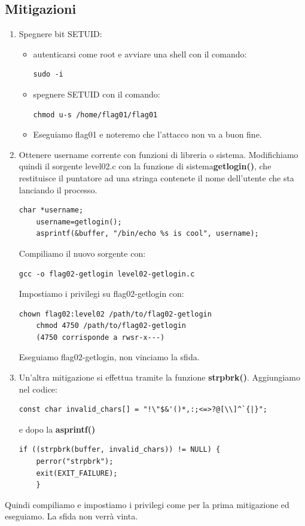 \subsection{Mitigazioni}
\begin{enumerate}
    \item Spegnere bit SETUID:
    \begin{itemize}
        \item autenticarsi come root e avviare una shell con il comando: \begin{lstlisting}[style=bashstyle] 
        sudo -i
        \end{lstlisting}
        \item spegnere SETUID con il comando: \begin{lstlisting}[style=bashstyle] 
        chmod u-s /home/flag01/flag01
        \end{lstlisting}   
        \item Eseguiamo flag01 e noteremo che l’attacco non va a buon fine. 
    \end{itemize}
    \item Ottenere username corrente con funzioni di libreria o sistema. Modifichiamo quindi il sorgente level02.c con la funzione di sistema\textbf{getlogin()}, che restituisce il puntatore ad una stringa contenete il nome dell’utente che sta lanciando il processo.
    \begin{lstlisting}[style=cstyle]
    char *username; 
    username=getlogin(); 
    asprintf(&buffer, "/bin/echo %s is cool", username);
    \end{lstlisting}
    Compiliamo il nuovo sorgente con:
    \begin{lstlisting}[style=bashstyle]
    gcc -o flag02-getlogin level02-getlogin.c
    \end{lstlisting}
    Impostiamo i privilegi su flag02-getlogin con:
    \begin{lstlisting}[style=bashstyle]
    chown flag02:level02 /path/to/flag02-getlogin 
    chmod 4750 /path/to/flag02-getlogin
    (4750 corrisponde a rwsr-x---)
    \end{lstlisting}
    Eseguiamo flag02-getlogin, non vinciamo la sfida.
    \item Un’altra mitigazione si effettua tramite la funzione \textbf{strpbrk()}. Aggiungiamo nel codice:
    \begin{lstlisting}[style=cstyle]
    const char invalid_chars[] = "!\"$&'()*,:;<=>?@[\\]^`{|}";
    \end{lstlisting}
    e dopo la \textbf{asprintf()}
    \begin{lstlisting}[style=cstyle]
    if ((strpbrk(buffer, invalid_chars)) != NULL) { 
    perror("strpbrk"); 
    exit(EXIT_FAILURE); 
    }
    \end{lstlisting}
\end{enumerate}
Quindi compiliamo e impostiamo i privilegi come per la prima mitigazione ed eseguiamo. La sfida non verrà vinta.

